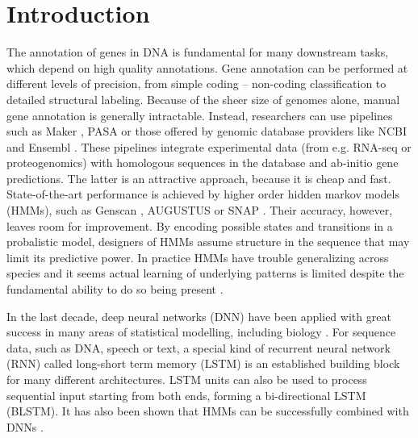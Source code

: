 \documentclass{bioinfo}
\begin{document}
\maketitle

\section{Introduction}
The annotation of genes in DNA is fundamental for many downstream tasks, which 
depend on high quality annotations. Gene annotation can be performed at different levels 
of precision, from simple coding -- non-coding classification to detailed structural 
labeling. Because of the sheer size of genomes alone, manual gene annotation is 
generally intractable. Instead, researchers can use pipelines such as 
Maker \citep{cantarel2008maker}, PASA \citep{haas2003improving} or those 
offered by genomic database providers like NCBI 
\citep{thibaud2013eukaryotic} and Ensembl \citep{aken2016ensembl}. 
These pipelines integrate experimental data (from e.g. RNA-seq 
or proteogenomics) with homologous sequences in the database and ab-initio gene 
predictions. The latter is an attractive approach, because it is cheap and fast. 
State-of-the-art performance is achieved by higher order hidden markov models 
(HMMs), such as Genscan \citep{burge1997prediction}, AUGUSTUS \citep{stanke2003gene} 
or SNAP \citep{johnson2008snap}. Their accuracy, however, leaves room for 
improvement. By encoding possible states and transitions in a probalistic model, 
designers of HMMs assume structure in the sequence that may limit its predictive 
power. In practice HMMs have trouble generalizing across species and it seems 
actual learning of underlying patterns is limited despite the fundamental ability 
to do so being present \citep{}. 

In the last decade, deep neural networks (DNN) have been applied with great success 
in many areas of statistical modelling, including biology 
\citep{ching2018opportunities}. For sequence data, such as DNA, speech or text, a 
special kind of recurrent neural network (RNN) called long-short term memory (LSTM) 
\citep{hochreiter1997long} is an established building block for many different 
architectures. LSTM units can also be used to process sequential input starting 
from both ends, forming a bi-directional LSTM (BLSTM). It has also been shown that 
HMMs can be successfully combined with DNNs \citep{liu2016novo, liu2016pedla}.
\end{document}
